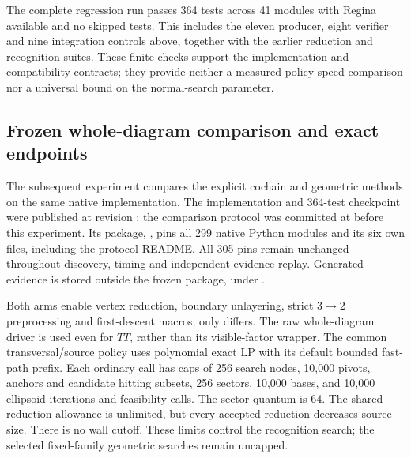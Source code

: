 The complete regression run passes 364 tests across 41 modules with
Regina available and no skipped tests.  This includes the eleven
producer, eight verifier and nine integration controls above, together
with the earlier reduction and recognition suites.  These finite
checks support the implementation and compatibility contracts; they
provide neither a measured policy speed comparison nor a universal
bound on the normal-search parameter.


\subsection{Frozen whole-diagram comparison and exact endpoints}
\label{subsec:geometric-descent-whole-call}

The subsequent experiment compares the explicit cochain and geometric
methods on the same native implementation.  The implementation and
364-test checkpoint were published at revision ; the
comparison protocol was committed at  before this
experiment.  Its package, , pins
all 299 native Python modules and its six own files, including the
protocol README.  All 305 pins remain unchanged throughout discovery,
timing and independent evidence replay.  Generated evidence is stored
outside the frozen package, under .

Both arms enable vertex reduction, boundary unlayering, strict $3\to2$
preprocessing and first-descent macros; only
 differs.  The raw whole-diagram driver
is used even for $TT$, rather than its visible-factor wrapper.
The common transversal/source policy uses polynomial exact LP with
its default bounded fast-path prefix.  Each ordinary call has caps of
256 search nodes, 10,000 pivots, anchors and candidate hitting subsets,
256 sectors, 10,000 bases, and 10,000 ellipsoid iterations and
feasibility calls.  The sector quantum is 64.  The shared reduction
allowance is unlimited, but every accepted reduction decreases source
size.  There is no wall cutoff.  These limits control the recognition
search; the selected fixed-family geometric searches remain uncapped.

